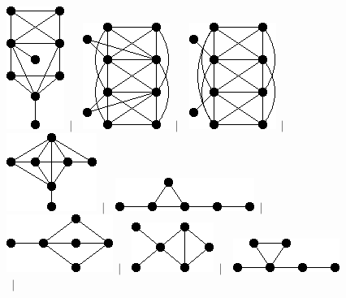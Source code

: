 \documentclass[11pt,paper=b5,footinclude,headinclude]{scrbook} %
\newtheorem{ex}{Vaja\hypertarget{sol:\theex}}[chapter]
\begin{document}
\begin{ex}
\begin{figure}
\includegraphics[scale=0.5]{smallGraphs/g_X154.png}$\,\mid\,$\
\includegraphics[scale=0.5]{smallGraphs/g_X155.png}$\,\mid\,$\
\includegraphics[scale=0.5]{smallGraphs/g_X158.png}$\,\mid\,$\
\includegraphics[scale=0.5]{smallGraphs/g_X159.png}$\,\mid\,$\
\includegraphics[scale=0.5]{smallGraphs/g_X166.png}$\,\mid\,$\
\includegraphics[scale=0.5]{smallGraphs/g_X167.png}$\,\mid\,$\
\includegraphics[scale=0.5]{smallGraphs/g_X168.png}$\,\mid\,$\
\includegraphics[scale=0.5]{smallGraphs/g_X169.png}$\,\mid\,$\

\end{figure}
\end{ex}
\end{document}
